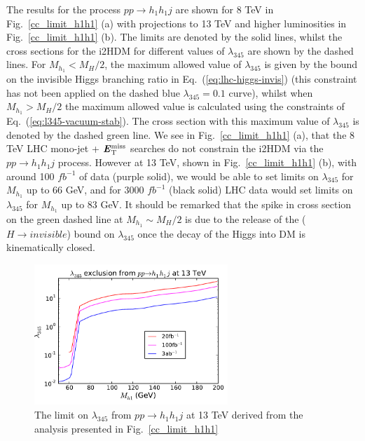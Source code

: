 The results for the process $pp\rightarrow h_1h_1 j$ are shown for 8 TeV in Fig.~\ref{cc_limit_h1h1} (a) with projections to 13 TeV and higher luminosities in Fig.~\ref{cc_limit_h1h1} (b). The limits are denoted by the solid lines, whilst the cross sections for the i2HDM for different values of $\lambda_{345}$ are shown by the dashed lines. For $M_{h_1} < M_H/2$, the maximum allowed value of $\lambda_{345}$ is given by the bound on the invisible Higgs branching ratio in Eq.~(\ref{eq:lhc-higgs-invis}) (this constraint has not been applied on the dashed blue $\lambda_{345} = 0.1$ curve), whilst when $M_{h_1} > M_H/2$ the maximum allowed value is calculated using the constraints of Eq.~(\ref{eq:l345-vacuum-stab}). The cross section with this maximum value of $\lambda_{345}$ is denoted by the dashed green line. We see in Fig.~\ref{cc_limit_h1h1} (a), that the 8 TeV LHC mono-jet + $\textbf{\textit{E}$_{\rm T}^{\rm miss}$}{}$ searches do not constrain the i2HDM via the $pp\rightarrow h_1h_1 j$ process. However at 13 TeV, shown in Fig.~\ref{cc_limit_h1h1} (b), with around 100 $fb^{-1}$ of data (purple solid), we would be able to set limits on $\lambda_{345}$ for $M_{h_1}$ up to 66 GeV, and for 3000 $fb^{-1} $ (black solid) LHC data would set limits on $\lambda_{345}$ for $M_{h_1}$ up to 83 GeV. 
It should be remarked that the spike in cross section on the green dashed line at $M_{h_1} \sim M_H/2$ is due to the release of the ($H \to invisible$) bound on $\lambda_{345}$ once the decay of the Higgs into DM is kinematically closed.

\begin{figure}[ht]
\centering
 \includegraphics[width=0.65\textwidth]{./Figures/lam345_limit_lhc13.pdf}
\caption{The limit on $\lambda_{345}$ from  $pp \to h_1 h_1 j$ at 13 TeV
derived from the analysis presented in Fig.~\ref{cc_limit_h1h1} \label{lam345_coll_limit}}
\end{figure}

